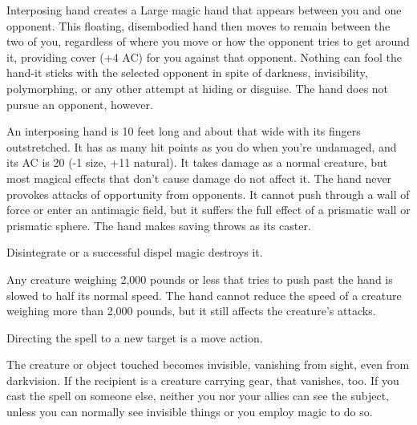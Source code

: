 \begin{multicols}{2}
\begin{small}

\noindent Interposing hand creates a Large magic hand that appears between you and one opponent. This floating, disembodied hand then moves to remain between the two of you, regardless of where you move or how the opponent tries to get around it, providing cover (+4 AC) for you against that opponent. Nothing can fool the hand-it sticks with the selected opponent in spite of darkness, invisibility, polymorphing, or any other attempt at hiding or disguise. The hand does not pursue an opponent, however.

\smallskip\noindent An interposing hand is 10 feet long and about that wide with its fingers outstretched. It has as many hit points as you do when you're undamaged, and its AC is 20 (-1 size, +11 natural). It takes damage as a normal creature, but most magical effects that don't cause damage do not affect it.
The hand never provokes attacks of opportunity from opponents. It cannot push through a wall of force or enter an antimagic field, but it suffers the full effect of a prismatic wall or prismatic sphere. The hand makes saving throws as its caster.

\smallskip\noindent Disintegrate or a successful dispel magic destroys it.

\smallskip\noindent Any creature weighing 2,000 pounds or less that tries to push past the hand is slowed to half its normal speed. The hand cannot reduce the speed of a creature weighing more than 2,000 pounds, but it still affects the creature's attacks.

\smallskip\noindent Directing the spell to a new target is a move action.


\noindent The creature or object touched becomes invisible, vanishing from sight, even from darkvision. If the recipient is a creature carrying gear, that vanishes, too. If you cast the spell on someone else, neither you nor your allies can see the subject, unless you can normally see invisible things or you employ magic to do so.


\end{small}
\end{multicols}
